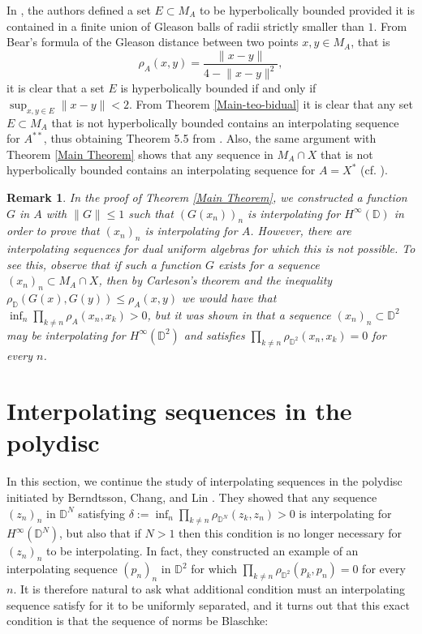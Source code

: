 \documentclass[preprint,12pt,number]{elsarticle}
\newtheorem{remark}[theorem]{Remark}
\newcommand{\D}{\mathbb{D}}
\begin{document}
In \cite{GalindoGamelinLindstrom2004}, the authors defined a set $E\subset M_A$ to be hyperbolically bounded provided it is contained in a finite union of Gleason balls of radii strictly smaller than $1$. From Bear's formula of the Gleason distance between two points $x,y\in M_A$, that is
\[
\rho_A(x,y)=\frac{\lVert x-y \rVert}{4-\lVert x-y \rVert^2}, 
\]
it is clear that a set $E$ is hyperbolically bounded if and only if $\sup_{x,y\in E}\lVert x-y \rVert<2$. From Theorem \ref{Main-teo-bidual} it is clear that any set $E\subset M_A$ that is not hyperbolically bounded contains an interpolating sequence for $A^{**}$, thus obtaining Theorem 5.5 from \cite{CarneColeGamelin1989}. Also, the same argument with Theorem \ref{Main Theorem} shows that any sequence in $M_A\cap X$ that is not hyperbolically bounded contains an interpolating sequence for $A=X^*$ (cf. \cite[Proposition 4.2]{GalindoLindstromMiralles2009}).

\begin{remark}
    In the proof of Theorem \ref{Main Theorem}, we constructed a function $G$ in $A$ with $\lVert G \rVert\leq1$ such that $(G(x_n))_n$ is interpolating for $H^\infty(\D)$ in order to prove that $(x_n)_n$ is interpolating for $A$. However, there are interpolating sequences for dual uniform algebras for which this is not possible. To see this, observe that if such a function $G$ exists for a sequence $(x_n)_n\subset M_A\cap X$, then by Carleson's theorem and the inequality $\rho_\D(G(x),G(y))\leq \rho_A(x,y)$ we would have that $\inf_{n}\prod_{k\neq n}\rho_A(x_n,x_k)>0$, but it was shown in \cite{BerndtssonChangLin1987} that a sequence $(x_n)_n\subset \D^2$ may be interpolating for $H^\infty(\D^2)$ and satisfies $\prod_{k\neq n}\rho_{\D^2}(x_n,x_k)=0$ for every $n$.
\end{remark}

\section{Interpolating sequences in the polydisc}\label{Section-polydisc}
\vspace{0.3cm}
In this section, we continue the study of interpolating sequences in the polydisc initiated by Berndtsson, Chang, and Lin \cite{BerndtssonChangLin1987}. They showed that any sequence $(z_n)_n$ in $\D^N$ satisfying $\delta:=\inf_n \prod_{k\neq n}\rho_{\D^N}(z_k,z_n)>0$ is interpolating for $H^\infty(\D^N)$, but also  that if $N>1$ then this condition is no longer necessary for $(z_n)_n$ to be interpolating. In fact, they constructed an example of an interpolating sequence $(p_n)_n$ in $\D^2$ for which $\prod_{k\neq n}\rho_{\D^2}(p_k,p_n)=0$ for every $n$. It is therefore natural to ask what additional condition must an interpolating sequence satisfy for it to be uniformly separated,  and it turns out that this exact condition is that the sequence of norms be Blaschke: 
\end{document}
